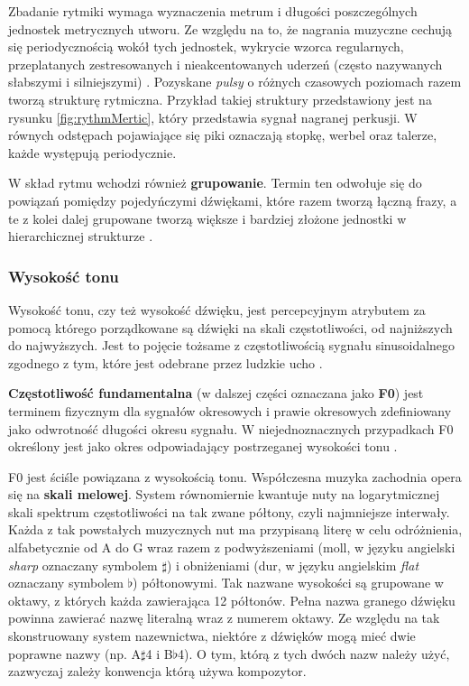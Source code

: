 \documentclass[12pt,a4paper,twoside]{mwart}
\begin{document}
Zbadanie rytmiki wymaga wyznaczenia metrum i długości poszczególnych jednostek metrycznych utworu. Ze względu na to, że nagrania muzyczne cechują się periodycznością wokół tych jednostek, wykrycie wzorca regularnych, przeplatanych zestresowanych i nieakcentowanych uderzeń (często nazywanych słabszymi i silniejszymi) \cite[12-35]{Transcription:Lerdahl:GenerativeTheory}. Pozyskane \textit{pulsy} o różnych czasowych poziomach razem tworzą strukturę rytmiczna. Przykład takiej struktury przedstawiony jest na rysunku \ref{fig:rythmMertic}, który przedstawia sygnał nagranej perkusji. W równych odstępach pojawiające się piki oznaczają stopkę, werbel oraz talerze, każde występują periodycznie.

W skład rytmu wchodzi również \textbf{grupowanie}. Termin ten odwołuje się do powiązań pomiędzy pojedyńczymi dźwiękami, które razem tworzą łączną frazy, a te z kolei dalej grupowane tworzą większe i bardziej złożone jednostki w hierarchicznej strukturze \cite[12-35]{Transcription:Lerdahl:GenerativeTheory}. 

\subsubsection{Wysokość tonu}

Wysokość tonu, czy też wysokość dźwięku, jest percepcyjnym atrybutem za pomocą którego porządkowane są dźwięki na skali częstotliwości, od najniższych do najwyższych. Jest to pojęcie tożsame z częstotliwością sygnału sinusoidalnego zgodnego z tym, które jest odebrane przez ludzkie ucho \cite[3491-3502]{Transcription:Hartmann:PitchPeriodicityAuditoryOrganization}. 

\textbf{Częstotliwość fundamentalna} (w dalszej części oznaczana jako \textbf{F0}) jest terminem fizycznym dla sygnałów okresowych i prawie okresowych zdefiniowany jako odwrotność długości okresu sygnału. W niejednoznacznych przypadkach F0 określony jest jako okres odpowiadający postrzeganej wysokości tonu \cite[8]{Transcription:Anssi:SignalProcessingMethods}.

F0 jest ściśle powiązana z wysokością tonu. Współczesna muzyka zachodnia opera się na \textbf{skali melowej}. System równomiernie kwantuje nuty na logarytmicznej skali spektrum częstotliwości na tak zwane półtony, czyli najmniejsze interwały. Każda z tak powstałych muzycznych nut ma przypisaną literę w celu odróżnienia, alfabetycznie od A do G wraz razem z podwyższeniami (moll, w języku angielski \textit{sharp} oznaczany symbolem $\sharp$) i obniżeniami (dur, w języku angielskim \textit{flat} oznaczany symbolem $\flat$) półtonowymi. Tak nazwane wysokości są grupowane w oktawy, z których każda zawierająca 12 półtonów. Pełna nazwa granego dźwięku powinna zawierać nazwę literalną wraz z numerem oktawy. Ze względu na tak skonstruowany system nazewnictwa, niektóre z dźwięków mogą mieć dwie poprawne nazwy (np. A$\sharp$4 i B$\flat$4). O tym, którą z tych dwóch nazw należy użyć, zazwyczaj zależy konwencja którą używa kompozytor.
\end{document}
